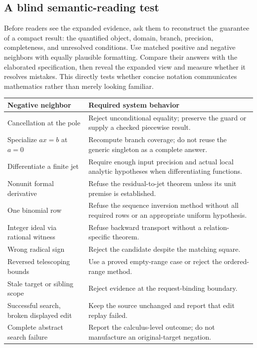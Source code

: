 \documentclass[11pt,letterpaper]{article}
\begin{document}
\subsection{A blind semantic-reading test}
Before readers see the expanded evidence, ask them to reconstruct the guarantee
of a compact result: the quantified object, domain, branch, precision,
completeness, and unresolved conditions. Use matched positive and negative
neighbors with equally plausible formatting. Compare their answers with the
elaborated specification, then reveal the expanded view and measure whether it
resolves mistakes. This directly tests whether concise notation communicates
mathematics rather than merely looking familiar.

\begin{center}\small
\begin{tabularx}{\textwidth}{@{}P{1.5in}Y@{}}
\toprule
Negative neighbor & Required system behavior\\
\midrule
Cancellation at the pole & Reject unconditional equality; preserve the guard
or supply a checked piecewise result.\\
Specialize \(ax=b\) at \(a=0\) & Recompute branch coverage; do not reuse the
generic singleton as a complete answer.\\
Differentiate a finite jet & Require enough input precision and actual local
analytic hypotheses when differentiating functions.\\
Nonunit formal derivative & Refuse the residual-to-jet theorem unless its unit
premise is established.\\
One binomial row & Refuse the sequence inversion method without all required
rows or an appropriate uniform hypothesis.\\
Integer ideal via rational witness & Refuse backward transport without a
relation-specific theorem.\\
Wrong radical sign & Reject the candidate despite the matching square.\\
Reversed telescoping bounds & Use a proved empty-range case or reject the
ordered-range method.\\
Stale target or sibling scope & Reject evidence at the request-binding boundary.\\
Successful search, broken displayed edit & Keep the source unchanged and report
that edit replay failed.\\
Complete abstract search failure & Report the calculus-level outcome; do not
manufacture an original-target negation.\\
\bottomrule
\end{tabularx}
\end{center}
\end{document}
